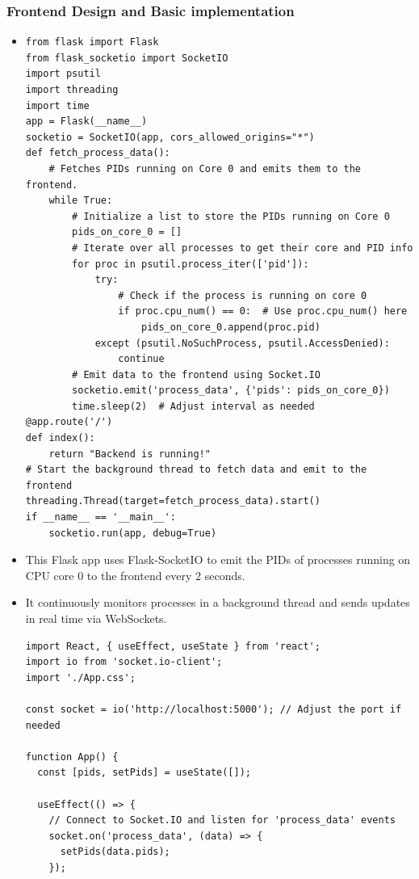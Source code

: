 \documentclass[12pt]{article}
\begin{document}
\subsubsection{Frontend Design and Basic implementation}
\begin{itemize}
    \item
        \begin{verbatim}
from flask import Flask
from flask_socketio import SocketIO
import psutil
import threading
import time
app = Flask(__name__)
socketio = SocketIO(app, cors_allowed_origins="*")
def fetch_process_data():
    # Fetches PIDs running on Core 0 and emits them to the frontend.
    while True:
        # Initialize a list to store the PIDs running on Core 0
        pids_on_core_0 = []
        # Iterate over all processes to get their core and PID info
        for proc in psutil.process_iter(['pid']):
            try:
                # Check if the process is running on core 0
                if proc.cpu_num() == 0:  # Use proc.cpu_num() here
                    pids_on_core_0.append(proc.pid)
            except (psutil.NoSuchProcess, psutil.AccessDenied):
                continue
        # Emit data to the frontend using Socket.IO
        socketio.emit('process_data', {'pids': pids_on_core_0})
        time.sleep(2)  # Adjust interval as needed
@app.route('/')
def index():
    return "Backend is running!"
# Start the background thread to fetch data and emit to the frontend
threading.Thread(target=fetch_process_data).start()
if __name__ == '__main__':
    socketio.run(app, debug=True)
        \end{verbatim}
    \item This Flask app uses Flask-SocketIO to emit the PIDs of processes running on CPU core 0 to the frontend every 2 seconds. 
    \item It continuously monitors processes in a background thread and sends updates in real time via WebSockets.
    \hfill
        \begin{verbatim}
import React, { useEffect, useState } from 'react';
import io from 'socket.io-client';
import './App.css';

const socket = io('http://localhost:5000'); // Adjust the port if needed

function App() {
  const [pids, setPids] = useState([]);

  useEffect(() => {
    // Connect to Socket.IO and listen for 'process_data' events
    socket.on('process_data', (data) => {
      setPids(data.pids);
    });


\end{verbatim}
\end{itemize}
\end{document}
